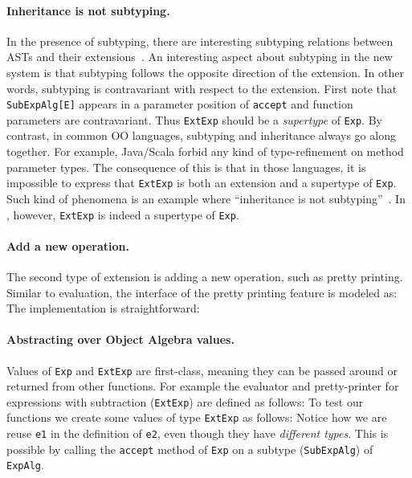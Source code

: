 \paragraph{Inheritance is not subtyping.} In the presence of subtyping, there
are interesting subtyping relations between ASTs and their
extensions~\cite{oliveira09modular}. An interesting aspect about subtyping in
the new system is that subtyping follows the opposite direction of the
extension. In other words, subtyping is contravariant with respect to the
extension. First note that \lstinline{SubExpAlg[E]} appears in a
parameter
position of \lstinline{accept} and function parameters are 
contravariant. Thus \lstinline{ExtExp} should be a \textit{supertype} of
\lstinline{Exp}. By contrast, in common OO languages, subtyping and
inheritance always go along together. For example, Java/Scala forbid any kind of
type-refinement on method parameter types. The consequence of this is that in
those languages, it is impossible to express that \lstinline{ExtExp} is both an
extension and a supertype of \lstinline{Exp}. Such kind of phenomena is an
example where ``inheritance is not
subtyping''~\cite{cook1989inheritance}. In \name, however,
\lstinline{ExtExp} is indeed a supertype of \lstinline{Exp}.

\paragraph{Add a new operation.} The second type of extension is adding a new
operation, such as pretty printing. Similar to evaluation, the interface of the
pretty printing feature is modeled as:
The implementation is straightforward:

\paragraph{Abstracting over Object Algebra values.} Values of \lstinline{Exp} and
\lstinline{ExtExp} are first-class, meaning they can be passed around or
returned from other functions. For example the evaluator and
pretty-printer for expressions with subtraction (\lstinline{ExtExp}) are defined as follows:
To test our functions we create some values of type \lstinline{ExtExp} as follows:
Notice how we are reuse \lstinline{e1} in the definition of
\lstinline{e2}, even though they have \emph{different types}. This is 
possible by calling the \lstinline{accept}
method of \lstinline{Exp} on a subtype (\lstinline{SubExpAlg})
of \lstinline{ExpAlg}.

